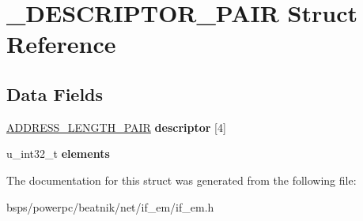 \hypertarget{struct__DESCRIPTOR__PAIR}{}\section{\+\_\+\+D\+E\+S\+C\+R\+I\+P\+T\+O\+R\+\_\+\+P\+A\+IR Struct Reference}
\label{struct__DESCRIPTOR__PAIR}
\subsection*{Data Fields}
\begin{DoxyCompactItemize}
\item 
\mbox{\label{struct__DESCRIPTOR__PAIR_a13b7325c90edf6c8a48ebe122a2ff2ab}} 
\mbox{\hyperlink{struct__ADDRESS__LENGTH__PAIR}{A\+D\+D\+R\+E\+S\+S\+\_\+\+L\+E\+N\+G\+T\+H\+\_\+\+P\+A\+IR}} {\bfseries descriptor} \mbox{[}4\mbox{]}
\item 
\mbox{\label{struct__DESCRIPTOR__PAIR_acf6894e71ef2c3b56c0f0e6354fb6192}} 
u\+\_\+int32\+\_\+t {\bfseries elements}
\end{DoxyCompactItemize}


The documentation for this struct was generated from the following file\+:\begin{DoxyCompactItemize}
\item 
bsps/powerpc/beatnik/net/if\+\_\+em/if\+\_\+em.\+h\end{DoxyCompactItemize}
